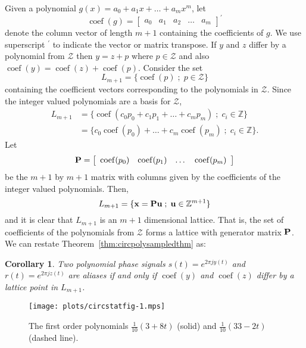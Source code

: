 \documentclass[aap]{imsart}
\newcommand{\ints}{{\mathbb Z}}
\newcommand{\term}{\emph}
\renewcommand{\mid}{\; ; \;}
\newtheorem{corollary}{Corollary}
\newcommand{\coef}{\operatorname{coef}}
\begin{document}
Given a polynomial $g(x) = a_0 + a_1x + \dots + a_m x^m$, let
\[
\coef(g) = \left[ \begin{array}{ccccc} a_0 & a_1 & a_2 & \dots & a_m \end{array} \right]^\prime
\]
denote the column vector of length $m+1$ containing the coefficients of $g$.  We use superscript $^\prime$ to indicate the vector or matrix transpose.  If $y$ and $z$ differ by a polynomial from $\mathcal{Z}$ then $y = z + p$ where $p \in \mathcal{Z}$ and also $\coef(y) = \coef(z) + \coef(p)$.
  Consider the set
\[
L_{m+1} = \{ \coef(p) \mid p \in \mathcal{Z} \}
\]
containing the coefficient vectors corresponding to the polynomials in $\mathcal{Z}$.  Since the integer valued polynomials are a basis for $\mathcal{Z}$,
\begin{align*}
L_{m+1} &= \{ \coef(c_0 p_0 + c_1p_1 + \dots + c_mp_m) \mid c_i \in \ints \} \\
&= \{ c_0 \coef(p_0) + \dots + c_m\coef(p_m) \mid c_i \in \ints \}.
\end{align*}
Let
\[
\Pbf = \left[ \begin{array}{cccc} \coef(p_0)& \coef(p_1)& \dots& \coef(p_m)  \end{array} \right]
\]
be the $m+1$ by $m+1$ matrix with columns given by the coefficients of the integer valued polynomials.  Then,
\[
L_{m+1} = \{ \xbf = \Pbf\ubf \mid \ubf \in \ints^{m+1} \}
\]
and it is clear that $L_{m+1}$ is an $m+1$ dimensional lattice.  That is, the set of coefficients of the polynomials from $\mathcal{Z}$ forms a lattice with generator matrix $\mathbf{P}$. We can restate Theorem~\ref{thm:circpolysampledthm} as:
\begin{corollary}\label{cor:circpolysampledcoef}
Two polynomial phase signals $s(t) = e^{2\pi j y(t)}$  and $r(t) = e^{2\pi j z(t)}$ are aliases if and only if $\coef(y)$ and $\coef(z)$ differ by a lattice point in $L_{m+1}$.
\end{corollary}


\begin{figure}[p]
	\centering
		\texttt{[image: plots/circstatfig-1.mps]}
		\caption{The first order polynomials $\tfrac{1}{10}(3 + 8t)$ (solid) and $\tfrac{1}{10}(33 - 2t)$ (dashed line).}
		\label{fig:circstatplot_line}
\end{figure}
\end{document}
